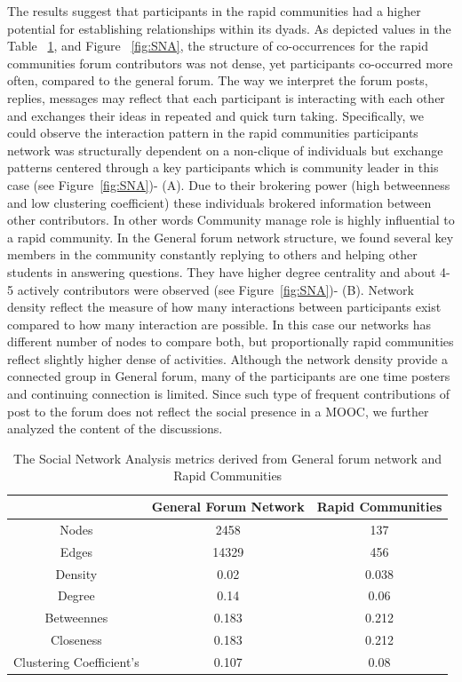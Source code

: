 \documentclass[manuscript,screen,review]{acmart}
\begin{document}
The results suggest that participants in the rapid communities had a higher potential for establishing relationships within its dyads. As depicted values in the Table ~\ref{tab:SNATab}, and Figure ~\ref{fig:SNA}, the structure of co-occurrences for the rapid communities forum contributors was not dense, yet participants co-occurred more often, compared to the general forum. The way we interpret the forum posts, replies, messages may reflect that each participant is interacting with each other and exchanges their ideas in repeated and quick turn taking. Specifically, we could observe the interaction pattern in the rapid communities participants network was structurally dependent on a non-clique of individuals but exchange patterns centered through a key participants which is community leader in this case (see Figure~\ref{fig:SNA})- (A). Due to their brokering power (high betweenness and low clustering coefficient) these individuals brokered information between other contributors. In other words Community manage role is highly influential to a rapid community. In the General forum network structure, we found several key members in the community constantly replying to others and helping other students in answering questions. They have higher degree centrality and about 4-5 actively contributors were observed (see Figure~\ref{fig:SNA})- (B). Network density reflect the measure of how many interactions between participants exist compared to how many interaction are possible. In this case our networks has different number of nodes to compare both, but proportionally rapid communities reflect slightly higher dense of activities. Although the network density provide a connected group in General forum, many of the participants are one time posters and continuing connection is limited. Since such type of frequent contributions of post to the forum does not reflect the social presence in a MOOC, we further analyzed the content of the discussions. 

\begin{table}[h!]
\caption{The Social Network Analysis metrics derived from General forum network and Rapid Communities}
\label{tab:SNATab}
    \begin{tabular}{c|c|c}
    \toprule
     & General Forum Network  & Rapid Communities   \\
     \midrule
     Nodes	& 2458 & 137    \\
     Edges & 14329 & 456   \\
     Density & 0.02 & 0.038  \\
     Degree & 0.14 & 0.06   \\ 
    Betweennes & 0.183 & 0.212 \\ 
    Closeness & 0.183 & 0.212  \\
    Clustering 
    Coefficient's & 0.107 & 0.08 \\
    \bottomrule
    \end{tabular}
    \end{table}
\end{document}

